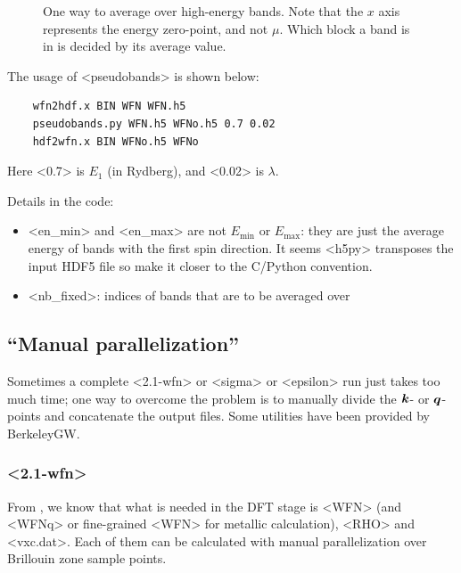 \documentclass[hyperref, a4paper, 12pt]{report}
\def\texttt#1{<#1>}%
\newcommand{\shortcode}[1]{\texttt{#1}}
\begin{document}
\begin{figure}
    \centering
    
    \caption{One way to average over high-energy bands. 
    Note that the $x$ axis represents the energy zero-point, 
    and not $\mu$.
    Which block a band is in is decided by its average value.}
    \label{fig:pseudobands}
\end{figure}

The usage of \shortcode{pseudobands} is shown below:
\begin{lstlisting}
    wfn2hdf.x BIN WFN WFN.h5
    pseudobands.py WFN.h5 WFNo.h5 0.7 0.02
    hdf2wfn.x BIN WFNo.h5 WFNo
\end{lstlisting}
Here \shortcode{0.7} is $E_1$ (in Rydberg), 
and \shortcode{0.02} is $\lambda$.

Details in the code: 
\begin{itemize}
    \item \shortcode{en_min} and \shortcode{en_max} are not $E_{\text{min}}$ or $E_{\text{max}}$:
        they are just the average energy of bands with the first spin direction.
        It seems \shortcode{h5py} transposes the input HDF5 file 
        so make it closer to the C/Python convention.
    \item \shortcode{nb_fixed}: indices of bands that are to be averaged over 
\end{itemize}

\subsection{``Manual parallelization''}

Sometimes a complete \shortcode{2.1-wfn} or \shortcode{sigma} or \shortcode{epsilon} run 
just takes too much time;
one way to overcome the problem is to 
manually divide the $\vb*{k}$- or $\vb*{q}$-points 
and concatenate the output files.
Some utilities have been provided by BerkeleyGW.

\subsubsection{\shortcode{2.1-wfn}}

From , 
we know that what is needed in the DFT stage 
is \shortcode{WFN} (and \shortcode{WFNq} or fine-grained \shortcode{WFN} for metallic calculation),
\shortcode{RHO} and \shortcode{vxc.dat}.
Each of them can be calculated 
with manual parallelization over Brillouin zone sample points.
\end{document}
